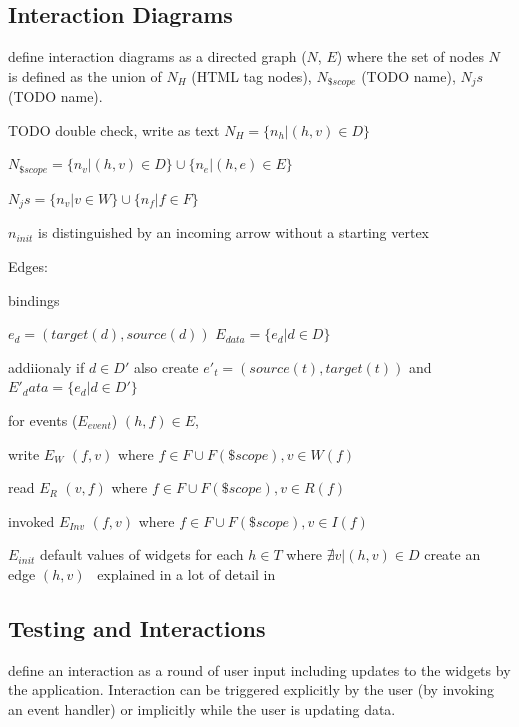 \subsection{Interaction Diagrams}
\label{intro:zhang_interaction_diagrams}
\textcite{zhang2019scenario} define interaction diagrams as a directed graph ($N$, $E$) where the set of nodes $N$ is defined as the union of $N_H$ (HTML tag nodes), $N_{\$scope}$ (TODO name), $N_js$ (TODO name). 

TODO double check, write as text
$N_H = \{n_h | (h,v) \in D\}$ %

$N_{\$scope} = \{n_v | (h,v) \in D\} \cup \{n_e | (h,e) \in E\} $ %

$N_js = \{n_v | v \in W\} \cup \{n_f | f \in F\} $

$n_{init}$ is distinguished by an incoming arrow without a starting vertex

Edges:

bindings 

$e_d = (target(d),source(d))$
$E_{data} = \{e_d |  d \in D \}$

addiionaly if $d \in D'$ also create $e'_t = (source(t),target(t))$ and $E'_data = \{e_d |  d \in D' \}$

for events ($E_{event}$) $(h,f) \in E$,

write $E_{W}$ $(f,v)$ where $f \in F \cup F(\$scope), v \in W(f)$

read $E_{R}$ $(v,f)$ where $f \in F \cup F(\$scope), v \in R(f)$

invoked $E_{Inv}$ $(f,v)$ where $f \in F \cup F(\$scope), v \in I(f)$


$E_{init}$ default values of widgets 
for each $h \in T $ where $ \nexists v | (h,v) \in D$ create an edge $(h,v)$ 
\
explained in a lot of detail in \parencite[9]{zhang2019scenario}

\subsection{Testing and Interactions}
\textcite{zhang2019scenario} define an interaction as a round of user input including updates to the widgets by the application. Interaction can be triggered explicitly by the user (by invoking an event handler) or implicitly while the user is updating data. \parencite{zhang2019scenario} %

